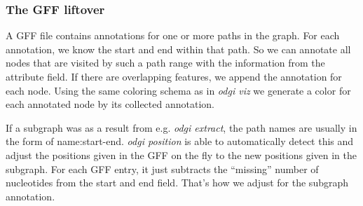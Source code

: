 \documentclass{bioinfo}
\begin{document}
\subsubsection{The GFF liftover}
\label{sec:supp_gff}
A GFF file contains annotations for one or more paths in the graph. For each annotation, we know the start and end within that path. So we can annotate all nodes that are visited by such a path range with the information from the attribute field. If there are overlapping features, we append the annotation for each node. Using the same coloring schema as in \textit{odgi viz} we generate a color for each annotated node by its collected annotation.

If a subgraph was as a result from e.g. \textit{odgi extract}, the path names are usually in the form of name:start-end. \textit{odgi position} is able to automatically detect this and adjust the positions given in the GFF on the fly to the new positions given in the subgraph. For each GFF entry, it just subtracts the “missing” number of nucleotides from the start and end field. That’s how we adjust for the subgraph annotation.
\end{document}
